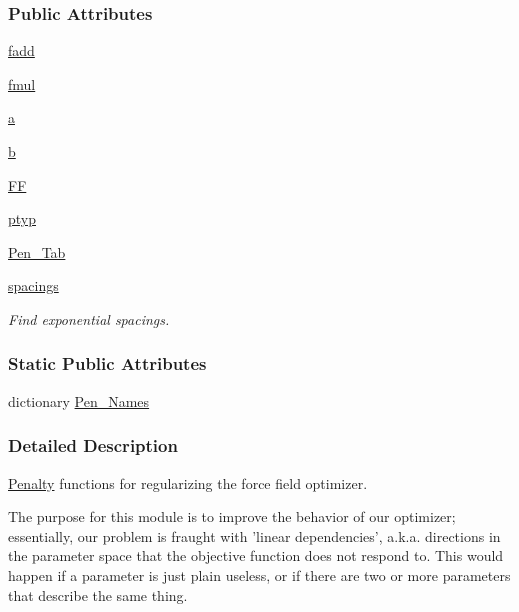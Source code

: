 \subsubsection*{Public Attributes}
\begin{DoxyCompactItemize}
\item 
\hyperlink{classforcebalance_1_1objective_1_1Penalty_a8c93cd0cfa455a54f957a061b5f7ac50}{fadd}
\item 
\hyperlink{classforcebalance_1_1objective_1_1Penalty_a71912752947b920f8679f09ed3a098a7}{fmul}
\item 
\hyperlink{classforcebalance_1_1objective_1_1Penalty_abab984da8a8f62adbd1decbaf56ac2fa}{a}
\item 
\hyperlink{classforcebalance_1_1objective_1_1Penalty_a0d9da5669d74dfd54a2fc639424e37b6}{b}
\item 
\hyperlink{classforcebalance_1_1objective_1_1Penalty_a4f8b9595066e7b51fa219bbfd98608ae}{F\-F}
\item 
\hyperlink{classforcebalance_1_1objective_1_1Penalty_aafed9613564329fc6a760aec26a43116}{ptyp}
\item 
\hyperlink{classforcebalance_1_1objective_1_1Penalty_a22bcc263d510e34d694faa9a70372a03}{Pen\-\_\-\-Tab}
\item 
\hyperlink{classforcebalance_1_1objective_1_1Penalty_a9832c430eccb9edf404ba12ed2f54541}{spacings}
\begin{DoxyCompactList}\small\item\em Find exponential spacings. \end{DoxyCompactList}\end{DoxyCompactItemize}
\subsubsection*{Static Public Attributes}
\begin{DoxyCompactItemize}
\item 
dictionary \hyperlink{classforcebalance_1_1objective_1_1Penalty_a0565dc1b08520f13edc984c14aa7ceb8}{Pen\-\_\-\-Names}
\end{DoxyCompactItemize}


\subsubsection{Detailed Description}
\hyperlink{classforcebalance_1_1objective_1_1Penalty}{Penalty} functions for regularizing the force field optimizer. 

The purpose for this module is to improve the behavior of our optimizer; essentially, our problem is fraught with 'linear dependencies', a.\-k.\-a. directions in the parameter space that the objective function does not respond to. This would happen if a parameter is just plain useless, or if there are two or more parameters that describe the same thing.

